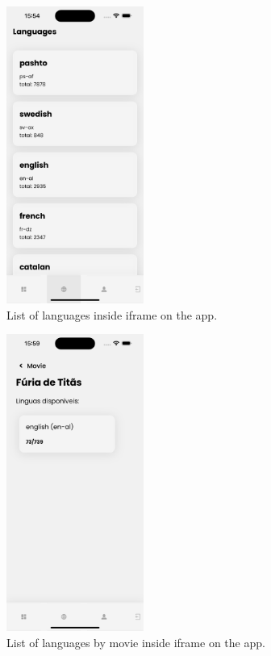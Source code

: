 \documentclass[12pt]{article}
\begin{document}
  \begin{figure}[h]
    \centering
    \caption{
     List of languages inside iframe on the app.
    }
    \label{fig:app3}
    \includegraphics[width=0.4\textwidth]{assets/16.png}
  \end{figure}


  \begin{figure}[h]
    \centering
    \caption{
     List of languages by movie inside iframe on the app.
    }
    \label{fig:app4}
    \includegraphics[width=0.4\textwidth]{assets/17.png}
  \end{figure}
\end{document}
